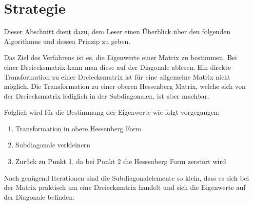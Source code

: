 \section{Strategie\label{francis:section:strategie}}
Dieser Abschnitt dient dazu, dem Leser einen Überblick über den folgenden Algorithmus und dessen Prinzip zu geben.

Das Ziel des Verfahrens ist es, die Eigenwerte einer Matrix zu bestimmen.
Bei einer Dreiecksmatrix kann man diese auf der Diagonale ablesen.
Ein direkte Transformation zu einer Dreiecksmatrix ist für eine allgemeine Matrix nicht möglich.
Die Transformation zu einer oberen Hessenberg Matrix, welche sich von der Dreiecksmatrix lediglich in der Subdiagonalen, ist aber machbar.

Folglich wird für die Bestimmung der Eigenwerte wie folgt vorgegangen:
\begin{enumerate}
	\item Transformation in obere Hessenberg Form
	\item Subdiagonale verkleinern
	\item Zurück zu Punkt 1, da bei Punkt 2 die Hessenberg Form zerstört wird
\end{enumerate}
Nach genügend Iterationen sind die Subdiagonalelemente so klein, dass es sich bei der Matrix praktisch um eine Dreieckmatrix handelt und sich die Eigenwerte auf der Diagonale befinden.

